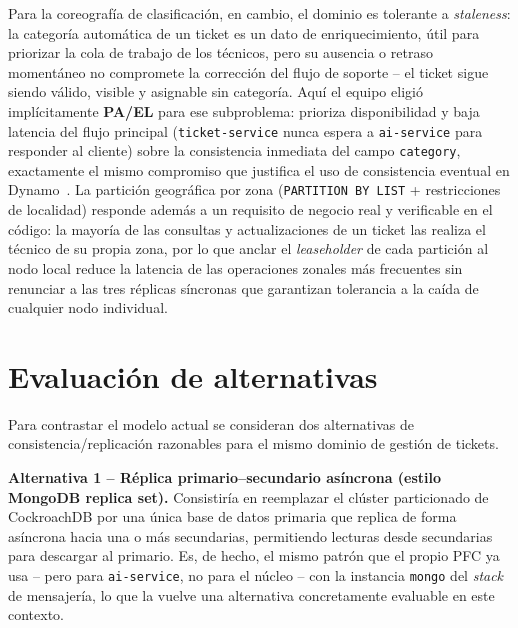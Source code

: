\documentclass[11pt,a4paper]{article}
\begin{document}
Para la coreograf\'ia de clasificaci\'on, en cambio, el dominio es tolerante a \emph{staleness}: la
categor\'ia autom\'atica de un ticket es un dato de enriquecimiento, \'util para priorizar la cola
de trabajo de los t\'ecnicos, pero su ausencia o retraso moment\'aneo no compromete la
correcci\'on del flujo de soporte -- el ticket sigue siendo v\'alido, visible y asignable sin
categor\'ia. Aqu\'i el equipo eligi\'o impl\'icitamente \textbf{PA/EL} para ese subproblema:
prioriza disponibilidad y baja latencia del flujo principal (\texttt{ticket-service} nunca espera
a \texttt{ai-service} para responder al cliente) sobre la consistencia inmediata del campo
\texttt{category}, exactamente el mismo compromiso que justifica el uso de consistencia eventual
en Dynamo~\cite{decandia2007}. La partici\'on geogr\'afica por zona (\texttt{PARTITION BY LIST} +
restricciones de localidad) responde adem\'as a un requisito de negocio real y verificable en el
c\'odigo: la mayor\'ia de las consultas y actualizaciones de un ticket las realiza el t\'ecnico de
su propia zona, por lo que anclar el \emph{leaseholder} de cada partici\'on al nodo local reduce la
latencia de las operaciones zonales m\'as frecuentes sin renunciar a las tres r\'eplicas
s\'incronas que garantizan tolerancia a la ca\'ida de cualquier nodo individual.

\section{Evaluaci\'on de alternativas}
\label{sec:alternativas}

Para contrastar el modelo actual se consideran dos alternativas de consistencia/replicaci\'on
razonables para el mismo dominio de gesti\'on de tickets.

\textbf{Alternativa 1 -- R\'eplica primario--secundario as\'incrona (estilo MongoDB replica
set).} Consistir\'ia en reemplazar el cl\'uster particionado de CockroachDB por una \'unica base de
datos primaria que replica de forma as\'incrona hacia una o m\'as secundarias, permitiendo lecturas
desde secundarias para descargar al primario. Es, de hecho, el mismo patr\'on que el propio PFC ya
usa -- pero para \texttt{ai-service}, no para el n\'ucleo -- con la instancia \texttt{mongo} del
\emph{stack} de mensajer\'ia, lo que la vuelve una alternativa concretamente evaluable en este
contexto.
\end{document}
